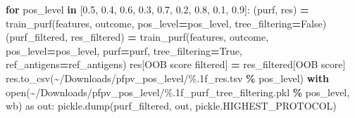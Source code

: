 \documentclass[
  11pt,
  oneside]{book}
\newenvironment{Shaded}{\begin{snugshade}}{\end{snugshade}}
\newcommand{\BuiltInTok}[1]{#1}
\newcommand{\ControlFlowTok}[1]{\textcolor[rgb]{0.13,0.29,0.53}{\textbf{#1}}}
\newcommand{\FloatTok}[1]{\textcolor[rgb]{0.00,0.00,0.81}{#1}}
\newcommand{\ImportTok}[1]{#1}
\newcommand{\KeywordTok}[1]{\textcolor[rgb]{0.13,0.29,0.53}{\textbf{#1}}}
\newcommand{\NormalTok}[1]{#1}
\newcommand{\OperatorTok}[1]{\textcolor[rgb]{0.81,0.36,0.00}{\textbf{#1}}}
\newcommand{\SpecialCharTok}[1]{\textcolor[rgb]{0.00,0.00,0.00}{#1}}
\newcommand{\StringTok}[1]{\textcolor[rgb]{0.31,0.60,0.02}{#1}}
\newcommand{\VariableTok}[1]{\textcolor[rgb]{0.00,0.00,0.00}{#1}}
\begin{document}
\begin{Shaded}
\begin{Highlighting}[]
\ControlFlowTok{for}\NormalTok{ pos\_level }\KeywordTok{in}\NormalTok{ [}\FloatTok{0.5}\NormalTok{, }\FloatTok{0.4}\NormalTok{, }\FloatTok{0.6}\NormalTok{, }\FloatTok{0.3}\NormalTok{, }\FloatTok{0.7}\NormalTok{, }\FloatTok{0.2}\NormalTok{, }\FloatTok{0.8}\NormalTok{, }\FloatTok{0.1}\NormalTok{, }\FloatTok{0.9}\NormalTok{]:}
\NormalTok{    (purf, res) }\OperatorTok{=}\NormalTok{ train\_purf(features, outcome, pos\_level}\OperatorTok{=}\NormalTok{pos\_level, tree\_filtering}\OperatorTok{=}\VariableTok{False}\NormalTok{)}
\NormalTok{    (purf\_filtered, res\_filtered) }\OperatorTok{=}\NormalTok{ train\_purf(features, outcome, pos\_level}\OperatorTok{=}\NormalTok{pos\_level, purf}\OperatorTok{=}\NormalTok{purf, tree\_filtering}\OperatorTok{=}\VariableTok{True}\NormalTok{, ref\_antigens}\OperatorTok{=}\NormalTok{ref\_antigens)}
\NormalTok{    res[}\StringTok{\textquotesingle{}OOB score filtered\textquotesingle{}}\NormalTok{] }\OperatorTok{=}\NormalTok{ res\_filtered[}\StringTok{\textquotesingle{}OOB score\textquotesingle{}}\NormalTok{]}
\NormalTok{    res.to\_csv(}\StringTok{\textquotesingle{}\textasciitilde{}/Downloads/pfpv\_pos\_level/}\SpecialCharTok{\%.1f}\StringTok{\_res.tsv\textquotesingle{}} \OperatorTok{\%}\NormalTok{ pos\_level)}
    \ControlFlowTok{with} \BuiltInTok{open}\NormalTok{(}\StringTok{\textquotesingle{}\textasciitilde{}/Downloads/pfpv\_pos\_level/}\SpecialCharTok{\%.1f}\StringTok{\_purf\_tree\_filtering.pkl\textquotesingle{}} \OperatorTok{\%}\NormalTok{ pos\_level, }\StringTok{\textquotesingle{}wb\textquotesingle{}}\NormalTok{) }\ImportTok{as}\NormalTok{ out:}
\NormalTok{        pickle.dump(purf\_filtered, out, pickle.HIGHEST\_PROTOCOL)}
\end{Highlighting}
\end{Shaded}
\end{document}
